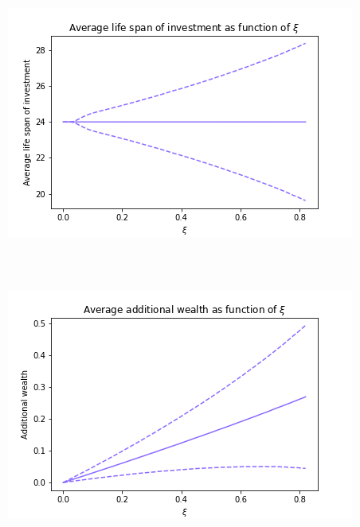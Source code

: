 \documentclass{article}
\begin{document}
\begin{figure}[b!]
     \centering
     \hfill
     \begin{subfigure}[b]{\textwidth}
         \centering
         \includegraphics[scale=.7]{png/average_life_span_non_fixed_W0=1_r=0.0004166666666666667_m=0.02592451988463669_sigma=0.06164058158266796_K=24_S=100000.png}
         \caption{}
         \label{fig:average-final-wealth-zero-life-span}
     \end{subfigure}
     \\
     \begin{subfigure}[b]{\textwidth}
         \centering
         \includegraphics[scale=.7]{png/additional_wealth_non_fixed_W0=1_r=0.0004166666666666667_m=0.02592451988463669_sigma=0.06164058158266796_K=24_S=100000.png}
         \caption{}
         \label{fig:average-final-wealth-zero-additional wealth}
     \end{subfigure}
     \\
     \begin{subfigure}[b]{\textwidth}
         \centering

\end{subfigure}
\end{figure}
\end{document}
